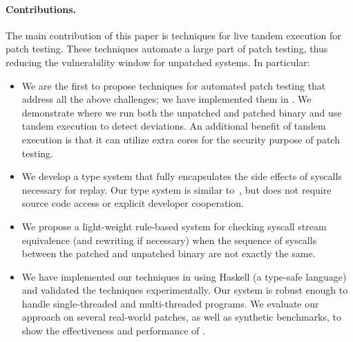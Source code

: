 \paragraph{Contributions.}
The main contribution of this paper is techniques for
live tandem execution for patch testing. These techniques automate
a large part of patch testing, thus reducing the vulnerability window for
unpatched systems.  In particular:
\begin{itemize}
\item We are the first to propose techniques for automated
  patch testing that address all the above challenges;
  we have implemented them in \tachyon. We demonstrate where we run both the
  unpatched and
  patched binary and use tandem execution to detect deviations. An
  additional benefit of tandem execution is that it can utilize
  extra cores for the security purpose of patch testing.

\item We develop a type system that fully encapsulates the side
  effects of syscalls necessary for replay. Our type system is similar
  to~\cite{guo:2008}, but does not require source code access or
  explicit developer cooperation.

\item We propose a light-weight rule-based system for checking syscall
  stream equivalence (and rewriting if necessary) when the sequence of
  syscalls between the patched and unpatched binary are not exactly
  the same.

\item We have implemented our techniques in \tachyon using Haskell (a type-safe
  language) and validated the techniques experimentally.  Our
  system is robust enough to handle single-threaded and
  multi-threaded programs. We evaluate our approach on several
  real-world patches, as well as synthetic benchmarks, to show the
  effectiveness and performance of \tachyon.


\end{itemize}

